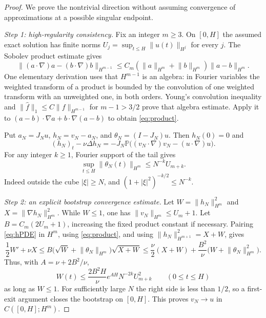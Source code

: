 \documentclass[11pt,a4paper]{article}
\theoremstyle{definition}\newtheorem{definition}[theorem]{Definition}
\theoremstyle{remark}\newtheorem{remark}[theorem]{Remark}
\newcommand{\PP}{\mathbb P}
\newcommand{\norm}[1]{\lVert #1\rVert}
\numberwithin{equation}{section}
\begin{document}
\begin{proof}
We prove the nontrivial direction without assuming convergence of approximations at a possible singular endpoint.

\emph{Step 1: high-regularity consistency.}
Fix an integer $m\ge3$. On $[0,H]$ the assumed exact solution has finite norms
$U_j=\sup_{t\le H}\norm{u(t)}_{H^j}$ for every $j$. The Sobolev product estimate gives
\begin{equation}\label{eq:product}
 \norm{(a\cdot\nabla)a-(b\cdot\nabla)b}_{H^{m-1}}
 \le C_m(\norm a_{H^m}+\norm b_{H^m})\norm{a-b}_{H^m}.
\end{equation}
One elementary derivation uses that $H^{m-1}$ is an algebra: in Fourier variables the weighted transform of a product is bounded by the convolution of one weighted transform with an unweighted one, in both orders. Young's convolution inequality and
$\norm{\widehat f}_1\le C\norm f_{H^{m-1}}$ for $m-1>3/2$ prove that algebra estimate. Apply it to $(a-b)\cdot\nabla a+b\cdot\nabla(a-b)$ to obtain \eqref{eq:product}.

Put $a_N=J_Nu$, $h_N=v_N-a_N$, and $\theta_N=(I-J_N)u$. Then $h_N(0)=0$ and
\begin{equation}\label{eq:hPDE}
 (h_N)_t-\nu\Delta h_N
 =-J_N\PP\bigl((v_N\cdot\nabla)v_N-(u\cdot\nabla)u\bigr).
\end{equation}
For any integer $k\ge1$, Fourier support of the tail gives
\begin{equation}\label{eq:tail}
 \sup_{t\le H}\norm{\theta_N(t)}_{H^m}\le N^{-k}U_{m+k}.
\end{equation}
Indeed outside the cube $|\xi|\ge N$, and $(1+|\xi|^2)^{-k/2}\le N^{-k}$.

\emph{Step 2: an explicit bootstrap convergence estimate.}
Let $W=\norm{h_N}_{H^m}^2$ and $X=\norm{\nabla h_N}_{H^m}^2$. While $W\le1$, one has $\norm{v_N}_{H^m}\le U_m+1$. Let $B=C_m(2U_m+1)$, increasing the fixed product constant if necessary. Pairing \eqref{eq:hPDE} in $H^m$, using \eqref{eq:product}, and using $\norm{h_N}_{H^{m+1}}^2=X+W$, gives
\[
 \frac12W'+\nu X
 \le B\bigl(\sqrt W+\norm{\theta_N}_{H^m}\bigr)\sqrt{X+W}
 \le\frac\nu2(X+W)+\frac{B^2}{\nu}
       \bigl(W+\norm{\theta_N}_{H^m}^2\bigr).
\]
Thus, with $A=\nu+2B^2/\nu$,
\begin{equation}\label{eq:convergence}
 W(t)\le\frac{2B^2H}{\nu}e^{AH}N^{-2k}U_{m+k}^2
 \qquad(0\le t\le H)
\end{equation}
as long as $W\le1$. For sufficiently large $N$ the right side is less than $1/2$, so a first-exit argument closes the bootstrap on $[0,H]$. This proves $v_N\to u$ in $C([0,H];H^m)$.


\end{proof}
\end{document}
